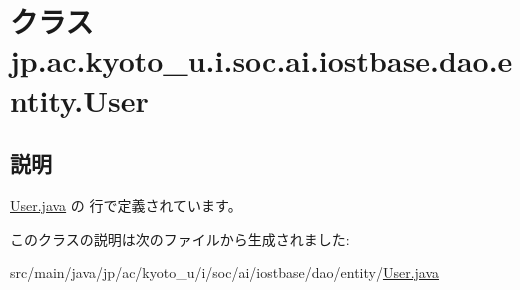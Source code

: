 \hypertarget{classjp_1_1ac_1_1kyoto__u_1_1i_1_1soc_1_1ai_1_1iostbase_1_1dao_1_1entity_1_1_user}{\section{クラス jp.\-ac.\-kyoto\-\_\-u.\-i.\-soc.\-ai.\-iostbase.\-dao.\-entity.\-User}
\label{classjp_1_1ac_1_1kyoto__u_1_1i_1_1soc_1_1ai_1_1iostbase_1_1dao_1_1entity_1_1_user}
}


\subsection{説明}


 \hyperlink{_user_8java_source}{User.\-java} の  行で定義されています。



このクラスの説明は次のファイルから生成されました\-:\begin{DoxyCompactItemize}
\item 
src/main/java/jp/ac/kyoto\-\_\-u/i/soc/ai/iostbase/dao/entity/\hyperlink{_user_8java}{User.\-java}\end{DoxyCompactItemize}

